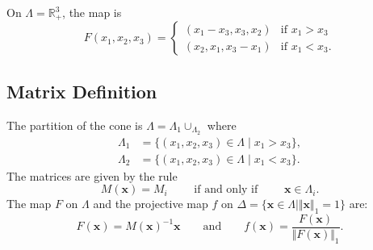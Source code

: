 On $\Lambda=\mathbb{R}^3_+$, the map is
\cite{cassaigne_algorithme_2015}
\[
F (x_1,x_2,x_3) = 
\begin{cases}
    (x_1-x_3, x_3, x_2) & \mbox{if } x_1 > x_3\\
    (x_2, x_1, x_3-x_1) & \mbox{if } x_1 < x_3.
\end{cases}
\]
\subsection{Matrix Definition}
The partition of the cone is
$\Lambda=\Lambda_1\cup_\Lambda_2$ where
\begin{align*}
	\Lambda_1 &= \{(x_1,x_2,x_3)\in\Lambda\mid 
	x_1 > x_3\}, \\
    \Lambda_2 &= \{(x_1,x_2,x_3)\in\Lambda\mid 
	x_1 < x_3\}.
\end{align*}
The matrices are given by the rule
\[
    M(\mathbf{x}) = M_i
    \qquad\text{ if and only if }\qquad
    \mathbf{x}\in\Lambda_i.
\]
The map $F$ on $\Lambda$ and
the projective map $f$ on
$\Delta=\{\mathbf{x}\in\Lambda\mid\Vert\mathbf{x}\Vert_1=1\}$ are:
\[
    F(\mathbf{x}) = M(\mathbf{x})^{-1}\mathbf{x}
    \qquad\text{and}\qquad
    f(\mathbf{x}) = \frac{F(\mathbf{x})}{\Vert F(\mathbf{x})\Vert_1}.
\]
